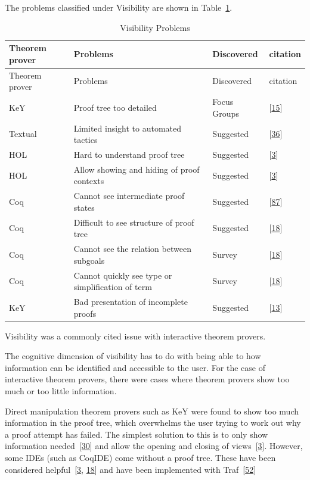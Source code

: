 \documentclass[
]{article}
\begin{document}
The problems classified under Visibility are shown in
Table~\ref{tbl:visibility}.

\hypertarget{tbl:visibility}{}
\begin{longtable}[]{@{}llll@{}}
\caption{\label{tbl:visibility}Visibility Problems}\tabularnewline
\toprule
Theorem prover & Problems & Discovered & citation \\
\midrule
\endfirsthead
\toprule
Theorem prover & Problems & Discovered & citation \\
\midrule
\endhead
KeY & Proof tree too detailed & Focus Groups &
{[}\protect\hyperlink{ref-beckert_usability_2015}{15}{]} \\
Textual & Limited insight to automated tactics & Suggested &
{[}\protect\hyperlink{ref-grebing_usability_2020}{36}{]} \\
HOL & Hard to understand proof tree & Suggested &
{[}\protect\hyperlink{ref-aitken_interactive_1998}{3}{]} \\
HOL & Allow showing and hiding of proof contexts & Suggested &
{[}\protect\hyperlink{ref-aitken_interactive_1998}{3}{]} \\
Coq & Cannot see intermediate proof states & Suggested &
{[}\protect\hyperlink{ref-zacchiroli_user_2007}{87}{]} \\
Coq & Difficult to see structure of proof tree & Suggested &
{[}\protect\hyperlink{ref-berman_development_2014}{18}{]} \\
Coq & Cannot see the relation between subgoals & Survey &
{[}\protect\hyperlink{ref-berman_development_2014}{18}{]} \\
Coq & Cannot quickly see type or simplification of term & Survey &
{[}\protect\hyperlink{ref-berman_development_2014}{18}{]} \\
KeY & Bad presentation of incomplete proofs & Suggested &
{[}\protect\hyperlink{ref-beckert_evaluating_2012}{13}{]} \\
\bottomrule
\end{longtable}

Visibility was a commonly cited issue with interactive theorem provers.

The cognitive dimension of visibility has to do with being able to how
information can be identified and accessible to the user. For the case
of interactive theorem provers, there were cases where theorem provers
show too much or too little information.

Direct manipulation theorem provers such as KeY were found to show too
much information in the proof tree, which overwhelms the user trying to
work out why a proof attempt has failed. The simplest solution to this
is to only show information
needed~{[}\protect\hyperlink{ref-eastaughffe_support_1998}{30}{]} and
allow the opening and closing of
views~{[}\protect\hyperlink{ref-aitken_interactive_1998}{3}{]}. However,
some IDEs (such as CoqIDE) come without a proof tree. These have been
considered
helpful~{[}\protect\hyperlink{ref-aitken_interactive_1998}{3},
\protect\hyperlink{ref-berman_development_2014}{18}{]} and have been
implemented with
Traf~{[}\protect\hyperlink{ref-kawabata_traf_2018}{52}{]}
\end{document}
